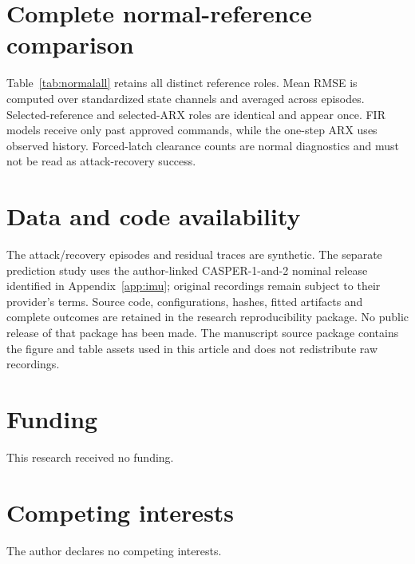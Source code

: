 \documentclass[11pt]{article}
\begin{document}
\begin{table}[htbp]\centering\small
\caption{Study I: additional metrics. All methods have 237,600 eligible observations and 135 intervention events.}\label{tab:metrics}
\setlength{\tabcolsep}{3pt}

\end{table}

\section{Complete normal-reference comparison}\label{app:normal}
Table~\ref{tab:normalall} retains all distinct reference roles. Mean RMSE is computed over standardized state channels and averaged across episodes. Selected-reference and selected-ARX roles are identical and appear once. FIR models receive only past approved commands, while the one-step ARX uses observed history. Forced-latch clearance counts are normal diagnostics and must not be read as attack-recovery success.

\begin{table}[htbp]\centering\small
\caption{Study II: all distinct roles on the new normal tasks. Every row uses 29,700 eligible observations and 108 probes.}\label{tab:normalall}
\setlength{\tabcolsep}{4pt}

\end{table}
\section*{Data and code availability}
The attack/recovery episodes and residual traces are synthetic. The separate prediction study uses the author-linked CASPER-1-and-2 nominal release identified in Appendix~\ref{app:imu}; original recordings remain subject to their provider's terms. Source code, configurations, hashes, fitted artifacts and complete outcomes are retained in the research reproducibility package. No public release of that package has been made. The manuscript source package contains the figure and table assets used in this article and does not redistribute raw recordings.

\section*{Funding}
This research received no funding.

\section*{Competing interests}
The author declares no competing interests.
\end{document}
